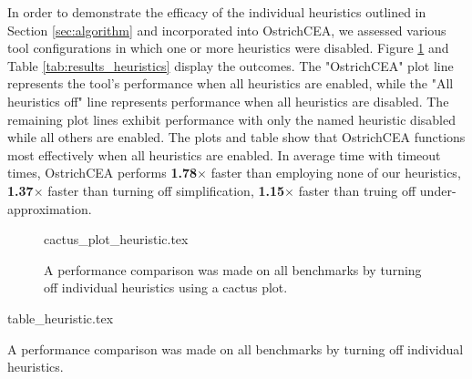 {  %
  In order to demonstrate the efficacy of the individual heuristics outlined in Section \ref{sec:algorithm} and incorporated into OstrichCEA, we assessed various tool configurations in which one or more heuristics were disabled. Figure \ref{fig:cactus_heuristics} and Table \ref{tab:results_heuristics} display the outcomes. The "OstrichCEA" plot line represents the tool's performance when all heuristics are enabled, while the "All heuristics off" line represents performance when all heuristics are disabled. The remaining plot lines exhibit performance with only the named heuristic disabled while all others are enabled. The plots and table show that OstrichCEA functions most effectively when all heuristics are enabled. In average time with timeout times, OstrichCEA performs \textbf{1.78}$\times$ faster than employing none of our heuristics, \textbf{1.37}$\times$ faster than turning off simplification, \textbf{1.15}$\times$ faster than truing off under-approximation.
  \begin{figure}
    {cactus_plot_heuristic.tex}
    \caption{A performance comparison was made on all benchmarks by turning off individual heuristics using a cactus plot.}
    \label{fig:cactus_heuristics}
  \end{figure}
  \begin{table}
    {table_heuristic.tex}
    \caption{A performance comparison was made on all benchmarks by turning off individual heuristics.}
    \label{tab:results_heuristics}
  \end{table}
}
%